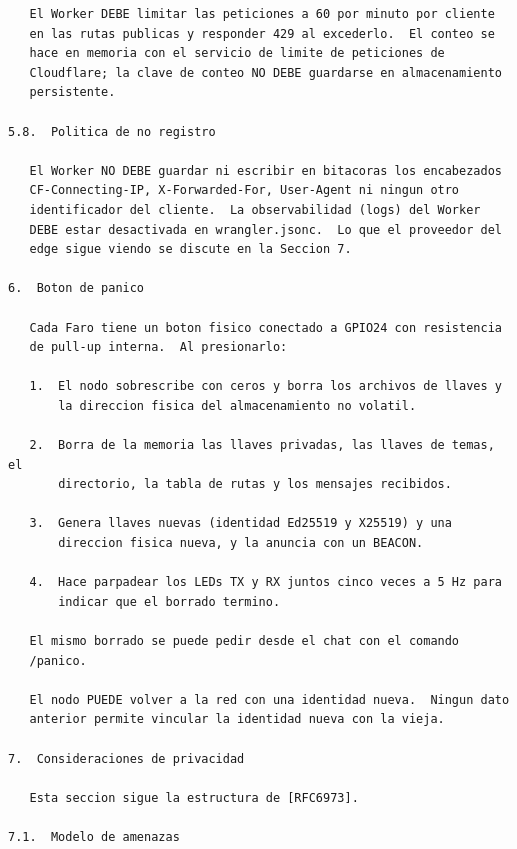 \newpage
\begin{Verbatim}
   El Worker DEBE limitar las peticiones a 60 por minuto por cliente
   en las rutas publicas y responder 429 al excederlo.  El conteo se
   hace en memoria con el servicio de limite de peticiones de
   Cloudflare; la clave de conteo NO DEBE guardarse en almacenamiento
   persistente.

5.8.  Politica de no registro

   El Worker NO DEBE guardar ni escribir en bitacoras los encabezados
   CF-Connecting-IP, X-Forwarded-For, User-Agent ni ningun otro
   identificador del cliente.  La observabilidad (logs) del Worker
   DEBE estar desactivada en wrangler.jsonc.  Lo que el proveedor del
   edge sigue viendo se discute en la Seccion 7.

6.  Boton de panico

   Cada Faro tiene un boton fisico conectado a GPIO24 con resistencia
   de pull-up interna.  Al presionarlo:

   1.  El nodo sobrescribe con ceros y borra los archivos de llaves y
       la direccion fisica del almacenamiento no volatil.

   2.  Borra de la memoria las llaves privadas, las llaves de temas, el
       directorio, la tabla de rutas y los mensajes recibidos.

   3.  Genera llaves nuevas (identidad Ed25519 y X25519) y una
       direccion fisica nueva, y la anuncia con un BEACON.

   4.  Hace parpadear los LEDs TX y RX juntos cinco veces a 5 Hz para
       indicar que el borrado termino.

   El mismo borrado se puede pedir desde el chat con el comando
   /panico.

   El nodo PUEDE volver a la red con una identidad nueva.  Ningun dato
   anterior permite vincular la identidad nueva con la vieja.

7.  Consideraciones de privacidad

   Esta seccion sigue la estructura de [RFC6973].

7.1.  Modelo de amenazas
\end{Verbatim}
\newpage
